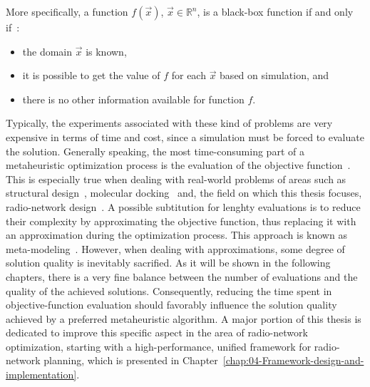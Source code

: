 More specifically, a function $f(\vec{x})$, $\vec{x}\in\mathbb{R}^{n}$,
is a black-box function if and only if~\cite{Talbi-Metaheuristics_from_design_to_implementation:2009}:
\begin{itemize}
\item the domain $\vec{x}$ is known,
\item it is possible to get the value of $f$ for each $\vec{x}$ based
on simulation, and
\item there is no other information available for function $f$.
\end{itemize}
Typically, the experiments associated with these kind of problems
are very expensive in terms of time and cost, since a simulation must
be forced to evaluate the solution. Generally speaking, the most time-consuming
part of a metaheuristic optimization process is the evaluation of
the objective function~\cite{Talbi_Metaheuristics:2009}. This is
especially true when dealing with real-world problems of areas such
as structural design~\cite{Barthelemy-Approximation_concepts_for_optimum_structural_design:1993},
molecular docking~\cite{Tantar-A_parallel_hybrid_genetic_algorithm_for_protein_structure_prediction:2007}
and, the field on which this thesis focuses, radio-network design~\cite{Benedicic_Pilot.power.optimization:2010,Benedicic_Balancing_downlink_uplink_soft_handover_areas_in_UMTS_networks:2012,Benedicic-A_GPU_based_parallel_agent_optimization_approach:2013,Benedicic-A_GRASS_GIS_parallel_module_for_radio-propagation_predictions:2013,Benedicic-An_adaptable_parallel_simulation_framework_for_LTE_coverage_planning:2013}.
A possible subtitution for lenghty evaluations is to reduce their
complexity by approximating the objective function, thus replacing
it with an approximation during the optimization process. This approach
is known as meta-modeling~\cite{Talbi_Metaheuristics:2009}. However,
when dealing with approximations, some degree of solution quality
is inevitably sacrified. As it will be shown in the following chapters,
there is a very fine balance between the number of evaluations and
the quality of the achieved solutions. Consequently, reducing the
time spent in objective-function evaluation should favorably influence
the solution quality achieved by a preferred metaheuristic algorithm.
A major portion of this thesis is dedicated to improve this specific
aspect in the area of radio-network optimization, starting with a
high-performance, unified framework for radio-network planning, which
is presented in Chapter~\ref{chap:04-Framework-design-and-implementation}.

